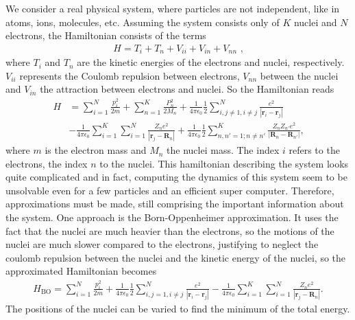 \documentclass[twoside,        %
			   11pt,			%
               BCOR10mm,       %
               ngerman,english  %
               ]{scrartcl}
\begin{document}
We consider a real physical system, where particles are not independent, like in atoms, ions, molecules, etc. Assuming the system consists only of $K$ nuclei and $N$ electrons, the Hamiltonian consists of the terms
\begin{align*}
    H = T_i + T_n+ V_{ii} + V_{in} + V_{nn} \text{ ,}
\end{align*} 
where $T_i $ and $T_n$ are the kinetic energies of the electrons and nuclei, respectively. $V_{ii}$ represents the Coulomb repulsion between electrons, $V_{nn}$ between the nuclei and $V_{in}$  the attraction between electrons and nuclei. So the Hamiltonian reads
\begin{align*}
    H &= \sum_{i=1}^N \frac{p_i^2}{2m} + \sum_{n=1}^K \frac{P_n^2}{2M_n} + \frac{1}{4\pi \epsilon_0}\frac{1}{2}\sum_{i,j\neq 1, i \neq j}^N \frac{e^2}{|\mathbf{r}_i - \mathbf{r}_j|} \\ &-  \frac{1}{4\pi \epsilon_0}\sum_{i=1}^K \sum_{i=1}^N \frac{Z_n e^2}{|\mathbf{r}_j-\mathbf{R}_n|} +  \frac{1}{4\pi \epsilon_0}\frac{1}{2} \sum_{n,n'=1;n\neq n'}^K \frac{Z_n Z_{n'} e^2}{|\mathbf{R}_n - \mathbf{R}_{n'}|} \text{,}
\end{align*} where $m$ is the electron mass and $M_n$ the nuclei mass. The index $i$ refers to the electrons, the index $n$ to the nuclei.
This hamiltonian describing the system looks quite complicated and in fact, computing the dynamics of this system seem to be unsolvable even for a few particles and an efficient super computer. Therefore, approximations must be made, still comprising the important information about the system. One approach is the Born-Oppenheimer approximation. It uses the fact that the nuclei are much heavier than the electrons, so the motions of the nuclei are much slower compared to the electrons, justifying to neglect the coulomb repulsion between the nuclei and the kinetic energy of the nuclei, so the approximated Hamiltonian becomes
\begin{align}\label{eq:H_BO}
H_\text{BO} = \sum_{i=1}^N \frac{p_i^2}{2m}  + \frac{1}{4\pi \epsilon_0}\frac{1}{2}\sum_{i,j = 1, i \neq j}^N \frac{e^2}{|\mathbf{r}_i - \mathbf{r}_j|} -  \frac{1}{4\pi \epsilon_0}\sum_{i=1}^K \sum_{i=1}^N \frac{Z_n e^2}{|\mathbf{r}_j-\mathbf{R}_n|}  \text{.}
\end{align}  
The positions of the nuclei can be varied to find the minimum of the total energy.
\end{document}
